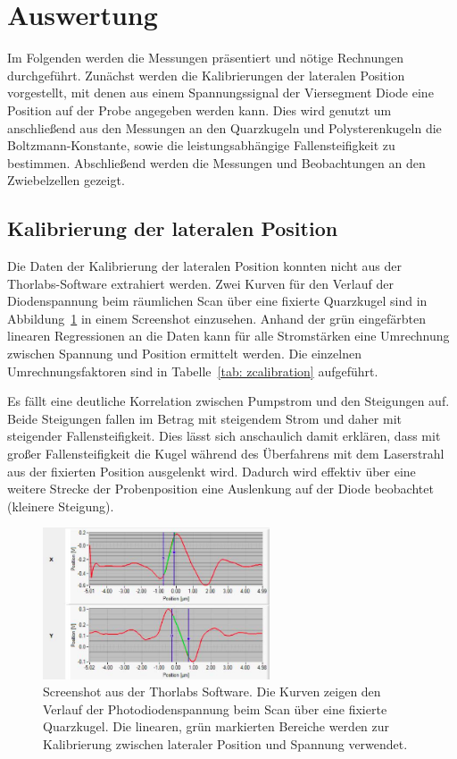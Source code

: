 \section{Auswertung}
Im Folgenden werden die Messungen präsentiert und nötige Rechnungen durchgeführt. Zunächst
werden die Kalibrierungen der lateralen Position vorgestellt, mit denen aus einem Spannungssignal der
Viersegment Diode eine Position auf der Probe angegeben werden kann. Dies wird genutzt um anschließend
aus den Messungen an den Quarzkugeln und Polysterenkugeln die Boltzmann-Konstante, sowie die leistungsabhängige
Fallensteifigkeit zu bestimmen. Abschließend werden die Messungen und Beobachtungen an den Zwiebelzellen
gezeigt.

\subsection{Kalibrierung der lateralen Position}
Die Daten der Kalibrierung der lateralen Position konnten nicht aus der Thorlabs-Software extrahiert werden. Zwei
Kurven für den Verlauf der Diodenspannung beim räumlichen Scan über eine fixierte Quarzkugel sind in Abbildung~\ref{fig: calibration}
in einem Screenshot einzusehen. Anhand der grün eingefärbten linearen Regressionen an die Daten kann für alle Stromstärken eine
Umrechnung zwischen Spannung und Position ermittelt werden. Die einzelnen Umrechnungsfaktoren sind in Tabelle~\ref{tab: zcalibration}
aufgeführt.

Es fällt eine deutliche Korrelation zwischen Pumpstrom und den Steigungen auf. Beide Steigungen fallen
im Betrag mit steigendem Strom und daher mit steigender Fallensteifigkeit.
Dies lässt sich anschaulich
damit erklären, dass mit großer Fallensteifigkeit die Kugel während des Überfahrens mit dem Laserstrahl
aus der fixierten Position ausgelenkt wird. Dadurch wird effektiv über eine weitere Strecke
der Probenposition eine Auslenkung auf der Diode beobachtet (kleinere Steigung).

\begin{figure}
  \centering
  \includegraphics[width = 0.6\textwidth]{../analysis/data/i_quarz/70mA/position_calibration_70mA.png}
  \caption{Screenshot aus der Thorlabs Software. Die Kurven zeigen den Verlauf der Photodiodenspannung beim Scan über
  eine fixierte Quarzkugel. Die linearen, grün markierten Bereiche werden zur Kalibrierung zwischen lateraler Position und Spannung verwendet.}
  \label{fig: calibration}
\end{figure}


